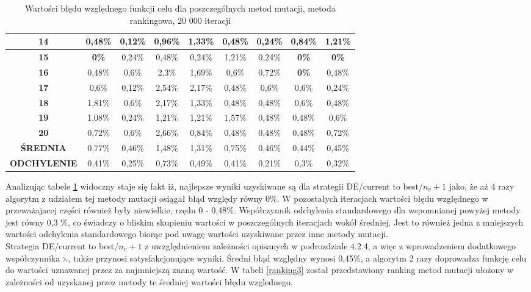 \begin{itemize}
\begin{table}[h!]
\begin{center}
{\begin{tabular}{|c|c|c|c|c|c|c|c|c|}
\hline
 \textbf{14}&0,48\%&0,12\%&0,96\%&1,33\%&0,48\%&0,24\%&0,84\%&1,21\%\\
\hline
 \textbf{15}&\color{green}\textbf{0\%}&0,24\%&0,48\%&0,24\%&1,21\%&0,24\%&\color{green}\textbf{0\%}&\color{green}\textbf{0\%}\\
\hline
 \textbf{16}&0,48\%&0,6\%&2,3\%&1,69\%&0,6\%&0,72\%&\color{green}\textbf{0\%}&0,48\%\\
\hline
 \textbf{17}&0,6\%&0,12\%&2,54\%&2,17\%&0,48\%&0,6\%&0,6\%&0,24\%\\
\hline
 \textbf{18}&1,81\%&0,6\%&2,17\%&1,33\%&0,48\%&0,48\%&0,6\%&0,48\%\\
\hline
 \textbf{19}&1,08\%&0,24\%&1,21\%&1,21\%&1,57\%&0,48\%&0,48\%&0,6\%\\
\hline
 \textbf{20}&0,72\%&0,6\%&2,66\%&0,84\%&0,48\%&0,48\%&0,48\%&0,72\%\\
\hline
 \textbf{ŚREDNIA}&0,77\%&0,46\%&1,48\%&1,31\%&0,75\%&0,46\%&0,44\%&0,45\%\\
\hline
 \textbf{ODCHYLENIE}&0,41\%&0,25\%&0,73\%&0,49\%&0,41\%&0,21\%&0,3\%&0,32\%\\
\hline
\end{tabular}}
\caption{Wartości błędu względnego funkcji celu dla poszczególnych metod mutacji, metoda rankingowa, 20 000 iteracji}
\label{rankingowa20}
\end{center}
\end{table}
\par
Analizując tabele \ref{rankingowa20} widoczny staje się fakt iż, najlepsze wyniki uzyskiwane są dla strategii DE/current to best/$n_{v}+1$ jako, że aż 4 razy algorytm z udziałem tej metody mutacji osiągał błąd względy równy 0\%. W pozostałych iteracjach wartości błędu względnego w przeważajacej części również były niewielkie, rzędu 0 - 0,48\%.  Współczynnik  odchylenia standardowego dla wspomnianej powyżej metody jest równy 0,3 \%, co świadczy o bliskim skupieniu wartości w poszczególnych iteracjach wokół średniej. Jest to również jedna z mniejszych wartości odchylenia standardowego biorąc pod uwagę wartości uzyskiwane przez inne metody mutacji.\\
Strategia  DE/current to best/$n_{v}+1$ z uwzględnieniem zależności opisanych w podrozdziale 4.2.4, a więc z wprowadzeniem dodatkowego współczynnika $\leftthreetimes$, także przynosi satysfakcjonujące wyniki. Średni błąd względny wynosi 0,45\%, a algorytm 2 razy doprowadza funkcję celu do wartości uznawanej przez \cite{qaplib} za najmniejszą znaną wartość. W tabeli \ref{ranking3} został przedstawiony ranking metod mutacji ułożony w zależności od uzyskanej przez metody te średniej wartości błędu wzglednego.


\end{itemize}
